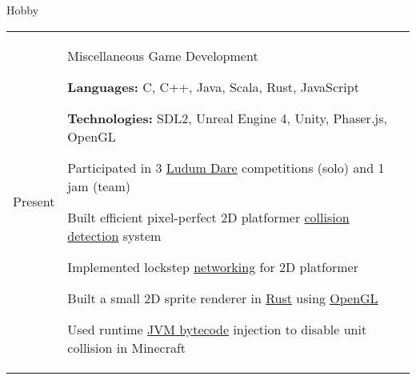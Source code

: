 \documentclass[12pt]{article}
\renewcommand{\section}[1]{{\Huge{#1}}\vspace{2 mm}}
\newenvironment{timeline}
        {\begin{tabular}{p{21 mm}|p{150 mm}}}
        {\end{tabular}}
\newenvironment{timelinetitle}
        {\vspace{-2 mm}\begin{large}}
        {\end{large}\vspace{-1.5 mm}}
\newcommand{\timespan}[2]{{#2}\newline{#1}}
\newcommand{\resumeitem}{\newline\vspace{3 mm}\hspace{3 mm}}
\newcommand{\resumestart}{\vspace{1 mm}}
\begin{document}
\vspace{3.0 mm}
\section{Hobby}
\hline

\begin{timeline}
\timespan{2011}{Present}
&
\begin{timelinetitle}
    Miscellaneous Game Development
\end{timelinetitle}
\resumestart

\resumeitem \textbf{Languages:} C, C++, Java, Scala, Rust, JavaScript

\resumeitem \textbf{Technologies:} SDL2, Unreal Engine 4, Unity, Phaser.js, OpenGL

\resumeitem Participated in 3 \underline{Ludum Dare} competitions (solo) and 1 jam (team)

\resumeitem Built efficient pixel-perfect 2D platformer \underline{collision detection} system

\resumeitem Implemented lockstep \underline{networking} for 2D platformer

\resumeitem Built a small 2D sprite renderer in \underline{Rust} using \underline{OpenGL}

\resumeitem Used runtime \underline{JVM bytecode} injection to disable unit collision in Minecraft

\end{timeline}
\end{document}

